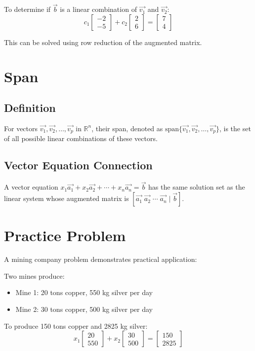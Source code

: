 \documentclass{article}
\begin{document}
To determine if $\vec{b}$ is a linear combination of $\vec{v_1}$ and $\vec{v_2}$:
\[
c_1\begin{bmatrix} -2 \\ -5 \end{bmatrix} + c_2\begin{bmatrix} 2 \\ 6 \end{bmatrix} = \begin{bmatrix} 7 \\ 4 \end{bmatrix}
\]

This can be solved using row reduction of the augmented matrix.

\section{Span}

\subsection{Definition}
For vectors $\vec{v_1}, \vec{v_2}, \ldots, \vec{v_p}$ in $\mathbb{R}^n$, their span, denoted as $\text{span}\{\vec{v_1}, \vec{v_2}, \ldots, \vec{v_p}\}$, is the set of all possible linear combinations of these vectors.

\subsection{Vector Equation Connection}
A vector equation $x_1\vec{a_1} + x_2\vec{a_2} + \cdots + x_n\vec{a_n} = \vec{b}$ has the same solution set as the linear system whose augmented matrix is $[\vec{a_1} \; \vec{a_2} \; \cdots \; \vec{a_n} \mid \vec{b}]$.

\section{Practice Problem}
A mining company problem demonstrates practical application:

Two mines produce:
\begin{itemize}
    \item Mine 1: 20 tons copper, 550 kg silver per day
    \item Mine 2: 30 tons copper, 500 kg silver per day
\end{itemize}

To produce 150 tons copper and 2825 kg silver:
\[
x_1\begin{bmatrix} 20 \\ 550 \end{bmatrix} + x_2\begin{bmatrix} 30 \\ 500 \end{bmatrix} = \begin{bmatrix} 150 \\ 2825 \end{bmatrix}
\]
\end{document}
